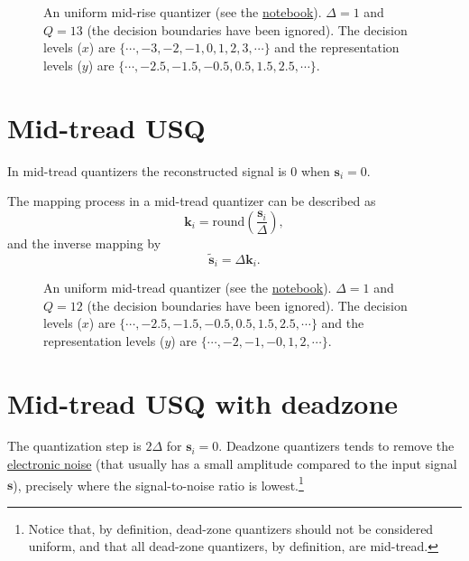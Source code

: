 \begin{figure}
  \caption{An uniform mid-rise quantizer (see the
    \href{https://nbviewer.jupyter.org/github/vicente-gonzalez-ruiz/quantization/blob/master/graphics/midrise.ipynb}{notebook}). $\Delta=1$
    and $Q=13$ (the decision boundaries have been ignored). The
    decision levels ($x$) are $\{\cdots,-3,-2,-1,0,1,2,3,\cdots\}$
    and the representation levels ($y$) are
    $\{\cdots,-2.5,-1.5,-0.5,0.5,1.5,2.5,\cdots\}$.}
  \label{fig:midrise}
\end{figure}

\section{Mid-tread USQ}

In mid-tread quantizers the reconstructed signal is 0 when ${\mathbf
  s}_i=0$.

The mapping process in a mid-tread quantizer can be described as
\begin{equation}
  {\mathbf k}_i = \text{round}( \frac{{\mathbf s}_i}{\Delta} ),
  \label{eq:mid-rise}
\end{equation}
and the inverse mapping by
\begin{equation}
  \tilde{\mathbf s}_i = \Delta{\mathbf k}_i.
  \label{eq:inverse_mid-rise}
\end{equation}

\begin{figure}
  \caption{An uniform mid-tread quantizer (see the
    \href{https://nbviewer.jupyter.org/github/vicente-gonzalez-ruiz/quantization/blob/master/graphics/midtread.ipynb}{notebook}). $\Delta=1$
    and $Q=12$ (the decision boundaries have been ignored). The
    decision levels ($x$) are $\{\cdots,-2.5,-1.5,-0.5,0.5,1.5,2.5,\cdots\}$
    and the representation levels ($y$) are
    $\{\cdots,-2,-1,-0,1,2,\cdots\}$.}
  \label{fig:midtread}
\end{figure}

\section{Mid-tread USQ with deadzone}

The quantization step is $2\Delta$ for ${\mathbf s}_i=0$. Deadzone
quantizers tends to remove the
\href{https://en.wikipedia.org/wiki/Noise_(electronics)}{electronic
  noise} (that usually has a small amplitude compared to the input
signal ${\mathbf s}$), precisely where the signal-to-noise ratio is
lowest.\footnote{Notice that, by definition, dead-zone quantizers
should not be considered uniform, and that all dead-zone quantizers,
by definition, are mid-tread.}

